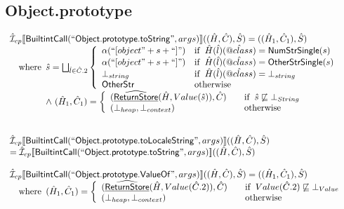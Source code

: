 \subsection{Object.prototype}
\[
\begin{array}{l}
\aI _{cp}\lbr \SF{BuiltintCall}(``\SF{Object.prototype.toString}",args)\rbr((\hat{H},\hat{C}), \hat{S})
  = ((\hat{H}_1, \hat{C}_1), \hat{S})\\
\quad\wherec{
  \hat{s} = \bigsqcup_{\hat{l}\in\hat{C}.2} \left\{\begin{array}{ll}
    \alpha(``[object"+ s +``]" ) & \ifc{\hat{H}(\hat{l})(\avarprop{class}) =\SF{NumStrSingle}(s)}\\
    \alpha(``[object"+ s +``]" ) & \ifc{\hat{H}(\hat{l})(\avarprop{class}) =\SF{OtherStrSingle}(s)}\\
    \bot_{string} & \ifc{\hat{H}(\hat{l})(\avarprop{class}) = \bot_{string}}\\
    \SF{OtherStr} & \owc
    \end{array}\right.\\
  \land\ (\hat{H}_1, \hat{C}_1) = 
    \left\{\begin{array}{l@{\quad\quad}l}
      (\ahf{ReturnStore}(\hat{H}, Value(\hat{s})), \hat{C})
      & \ifc{\hat{s} \not\sqsubseteq \bot_{String}}\\
      (\bot_{heap}, \bot_{context}) & \owc \\
    \end{array}\right.\\    
  }\\
\\\\ 



\aI _{cp}\lbr \SF{BuiltintCall}(``\SF{Object.prototype.toLocaleString}",args)\rbr((\hat{H},\hat{C}), \hat{S})
\\ = \aI _{cp}\lbr \SF{BuiltintCall}(``\SF{Object.prototype.toString}",args)\rbr((\hat{H},\hat{C}), \hat{S})
\\\\ 



\aI _{cp}\lbr \SF{BuiltintCall}(``\SF{Object.prototype.ValueOf}",args)\rbr((\hat{H},\hat{C}), \hat{S})  = ((\hat{H}_1, \hat{C}_1), \hat{S})\\
\quad\wherec{
  (\hat{H}_1, \hat{C}_1) = 
    \left\{\begin{array}{l@{\quad\quad}l}
      (\ahf{ReturnStore}(\hat{H}, Value(\hat{C}.2)), \hat{C})
      & \ifc{Value(\hat{C}.2) \not\sqsubseteq \bot_{Value}}\\
      (\bot_{heap}, \bot_{context}) & \owc \\
    \end{array}\right.\\    
  }\\
\\\\
  

\end{array}\]
